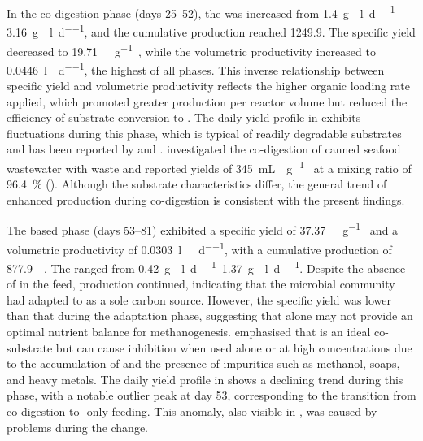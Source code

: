 \documentclass[12pt, a4paper, oneside]{report}
\begin{document}
In the co-digestion phase (days \numrange[parse-numbers=false]{25}{52}), the  was increased from \qtyrange{1.4}{3.16}{\gram\VS\per\litre\per\day}, and the cumulative  production reached \qty{1249.9}{\nml}. The specific yield decreased to \qty{19.71}{\nml\CH\per\gram\VSfed}, while the volumetric productivity increased to \qty{0.0446}{\litre\per\reactorlitre\per\day}, the highest of all phases. This inverse relationship between specific yield and volumetric productivity reflects the higher organic loading rate applied, which promoted greater  production per reactor volume but reduced the efficiency of substrate conversion to . The daily yield profile in  exhibits fluctuations during this phase, which is typical of readily degradable substrates and has been reported by \textcite{tomczak2025} and \textcite{srimachai2025}. \textcite{srimachai2025} investigated the co-digestion of canned seafood wastewater with  waste and reported  yields of \qty{345}{\mL\CH\per\gram\COD} at a mixing ratio of \qty{96.4}{\percent} (). Although the substrate characteristics differ, the general trend of enhanced  production during co-digestion is consistent with the present findings.

The  based phase (days \numrange[parse-numbers=false]{53}{81}) exhibited a specific yield of \qty{37.37}{\nml\CH\per\gram\VSfed} and a volumetric productivity of \qty{0.0303}{\litre\CH\per\reactorlitre\per\day}, with a cumulative  production of \qty{877.9}{\nml\CH}. The  ranged from \qtyrange{0.42}{1.37}{\gram\VS\per\litre\per\day}. Despite the absence of  in the feed,  production continued, indicating that the microbial community had adapted to  as a sole carbon source. However, the specific yield was lower than that during the adaptation phase, suggesting that  alone may not provide an optimal nutrient balance for methanogenesis. \textcite{tomczak2025} emphasised that  is an ideal co-substrate but can cause inhibition when used alone or at high concentrations due to the accumulation of  and the presence of impurities such as methanol, soaps, and heavy metals. The daily yield profile in  shows a declining trend during this phase, with a notable outlier peak at day \num[parse-numbers=false]{53}, corresponding to the transition from co-digestion to -only feeding. This anomaly, also visible in , was caused by problems during the change.
\end{document}
